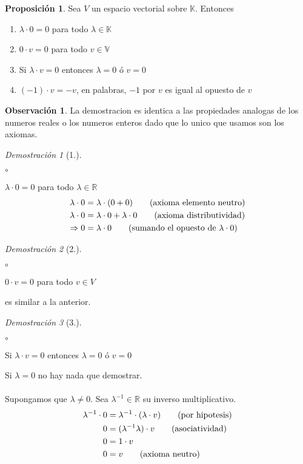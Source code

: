 \documentclass{article}
\theoremstyle{definition}
\theoremstyle{definition}
\newtheorem*{obs}{Observación}
\newtheorem{prop}[teo]{Proposición}
\theoremstyle{remark}
\newtheorem*{demo}{Demostración}
\begin{document}
\begin{prop}
  Sea $V$ un espacio vectorial sobre $\mathbb{K}$. Entonces 
  \begin{enumerate}[label=\arabic*.] 
  \item $\lambda \cdot 0=0$ para todo $ \lambda \in \mathbb{K}$ 
  \item $0 \cdot v = 0$ para todo $v \in \mathbb{V}$ 
  \item Si $\lambda \cdot v = 0$  entonces $\lambda = 0$ ó $v=0$
  \item $(-1)\cdot v=-v$, en palabras, $-1$ por $v$ es igual al opuesto de $v$
\end{enumerate}
\end{prop}
\begin{obs}
  La demostracion es identica a las propiedades analogas de los numeros reales o los numeros enteros dado que lo unico que usamos son los axiomas.
\end{obs}
\begin{demo}[1.]\;
\begin{list}{$\circ$}{}  
\item $\lambda \cdot 0 = 0 $ para todo $ \lambda \in \mathbb{R}$ 
\begin{align}
 \lambda \cdot 0 &= \lambda \cdot (0 + 0) \tag{axioma elemento neutro} \\
 \lambda \cdot 0 &= \lambda \cdot 0 + \lambda \cdot 0 \tag{axioma distributividad} \\
 \Rightarrow 0 &= \lambda \cdot 0 \tag{sumando el opuesto de $\lambda \cdot 0$}
 \notag
 \end{align}

\end{list}\end{demo}
\begin{demo}[2.]\;
\begin{list}{$\circ$}{}  
\item  $0 \cdot v = 0$ para todo $v \in V$
\end{list}
es similar a la anterior.
\end{demo}
\begin{demo}[3.]\;
\begin{list}{$\circ$}{}  
\item  Si $\lambda \cdot v= 0$ entonces $\lambda = 0$ ó $v =0$
\end{list}
Si $\lambda=0$ no hay nada que demostrar. \\\\
Supongamos que $\lambda \neq 0$. Sea $\lambda ^{-1} \in \mathbb{R}$ su inverso multiplicativo. 
\begin{align}
  \lambda^{-1}\cdot 0 &= \lambda^{-1}\cdot (\lambda \cdot v)\tag{por hipotesis} \\
  0&= (\lambda^{-1}\lambda)\cdot v \tag{asociatividad} \\
  0 &= 1 \cdot v  \notag \\
  0&=v \tag{axioma neutro}
 \notag
 \end{align}
\end{demo}
\end{document}
